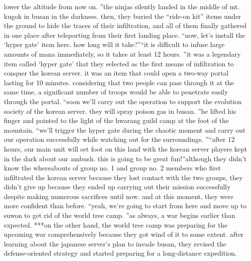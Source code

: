  lower the altitude from now on.
”the ninjas silently landed in the middle of mt.
 kugok in busan in the darkness.
then, they buried the “ride-on kit” items under the ground to hide the traces of their infiltration, and all of them finally gathered in one place after teleporting from their first landing place.
“now, let’s install the ‘hyper gate’ item here.
 how long will it take?”“it is difficult to infuse large amounts of mana immediately, so it takes at least 12 hours.
”it was a legendary item called ‘hyper gate’ that they selected as the first means of infiltration to conquer the korean server.
it was an item that could open a two-way portal lasting for 10 minutes.
 considering that two people can pass through it at the same time, a significant number of troops would be able to penetrate easily through the portal.
“soon we’ll carry out the operation to support the evolution society of the korean server.
 they will spray poison gas in busan.
”he lifted his finger and pointed to the light of the hwarang guild camp at the foot of the mountain.
“we’ll trigger the hyper gate during the chaotic moment and carry out our operation successfully while watching out for the surroundings.
”“after 12 hours, our main unit will set foot on this land with the korean server players kept in the dark about our ambush.
 this is going to be great fun!”although they didn’t know the whereabouts of group no.
 1 and group no.
 2 members who first infiltrated the korean server because they lost contact with the two groups, they didn’t give up because they ended up carrying out their mission successfully despite making numerous sacrifices until now.
and at this moment, they were more confident than before.
“yeah, we’re going to start from here and move up to suwon to get rid of the world tree camp.
”as always, a war begins earlier than expected.
***on the other hand, the world tree camp was preparing for the upcoming war comprehensively because they got wind of it to some extent.
after learning about the japanese server’s plan to invade busan, they revised the defense-oriented strategy and started preparing for a long-distance expedition.



